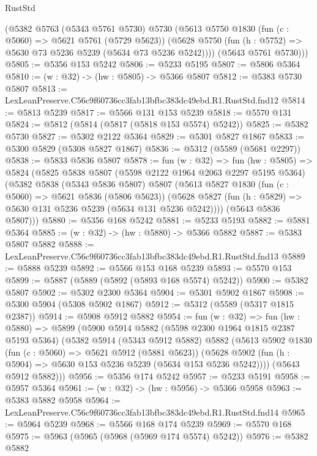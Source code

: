 \begin{lexlean}{RustStd}
\begin{coremodule}
      (@5382
        @5763
        (@5343 @5761 @5730)
        @5730
        (@5613
          @5750
          @1830
          (fun (c : @5060) => @5621 @5761 (@5729 @5623))
          (@5628 @5750 (fun (h : @5752) => @5630 @73 @5236 @5239 (@5634 @73 @5236 @5242))))
        (@5643 @5761 @5730)))
@5805 := @5356 @153 @5242
@5806 := @5233 @5195
@5807 := @5806 @5364
@5810 := (w : @32) -> (hw : @5805) -> @5366 @5807
@5812 := @5383 @5730 @5807
@5813 := LexLeanPreserve.C56c9f60736cc3fab13bfbc383dc49ebd.R1.RustStd.fnd12
@5814 := @5813 @5239
@5817 := @5566 @131 @153 @5239
@5818 := @5570 @131
@5824 := @5812 (@5814 (@5817 (@5818 @153 @5574) @5242))
@5825 := @5382 @5730
@5827 := @5302 @2122 @5364
@5829 := @5301 @5827 @1867
@5833 := @5300 @5829 (@5308 @5827 @1867)
@5836 := @5312 (@5589 (@5681 @2297))
@5838 := @5833 @5836 @5807
@5878 := fun (w : @32) =>
  fun (hw : @5805) =>
  @5824
    (@5825
      @5838
      @5807
      (@5598 @2122 @1964 @2063 @2297 @5195 @5364)
      (@5382
        @5838
        (@5343 @5836 @5807)
        @5807
        (@5613
          @5827
          @1830
          (fun (c : @5060) => @5621 @5836 (@5806 @5623))
          (@5628 @5827 (fun (h : @5829) => @5630 @131 @5236 @5239 (@5634 @131 @5236 @5242))))
        (@5643 @5836 @5807)))
@5880 := @5356 @168 @5242
@5881 := @5233 @5193
@5882 := @5881 @5364
@5885 := (w : @32) -> (hw : @5880) -> @5366 @5882
@5887 := @5383 @5807 @5882
@5888 := LexLeanPreserve.C56c9f60736cc3fab13bfbc383dc49ebd.R1.RustStd.fnd13
@5889 := @5888 @5239
@5892 := @5566 @153 @168 @5239
@5893 := @5570 @153
@5899 := @5887 (@5889 (@5892 (@5893 @168 @5574) @5242))
@5900 := @5382 @5807
@5902 := @5302 @2300 @5364
@5904 := @5301 @5902 @1867
@5908 := @5300 @5904 (@5308 @5902 @1867)
@5912 := @5312 (@5589 (@5317 @1815 @2387))
@5914 := @5908 @5912 @5882
@5954 := fun (w : @32) =>
  fun (hw : @5880) =>
  @5899
    (@5900
      @5914
      @5882
      (@5598 @2300 @1964 @1815 @2387 @5193 @5364)
      (@5382
        @5914
        (@5343 @5912 @5882)
        @5882
        (@5613
          @5902
          @1830
          (fun (c : @5060) => @5621 @5912 (@5881 @5623))
          (@5628 @5902 (fun (h : @5904) => @5630 @153 @5236 @5239 (@5634 @153 @5236 @5242))))
        (@5643 @5912 @5882)))
@5956 := @5356 @174 @5242
@5957 := @5233 @5191
@5958 := @5957 @5364
@5961 := (w : @32) -> (hw : @5956) -> @5366 @5958
@5963 := @5383 @5882 @5958
@5964 := LexLeanPreserve.C56c9f60736cc3fab13bfbc383dc49ebd.R1.RustStd.fnd14
@5965 := @5964 @5239
@5968 := @5566 @168 @174 @5239
@5969 := @5570 @168
@5975 := @5963 (@5965 (@5968 (@5969 @174 @5574) @5242))
@5976 := @5382 @5882

\end{coremodule}
\end{lexlean}

